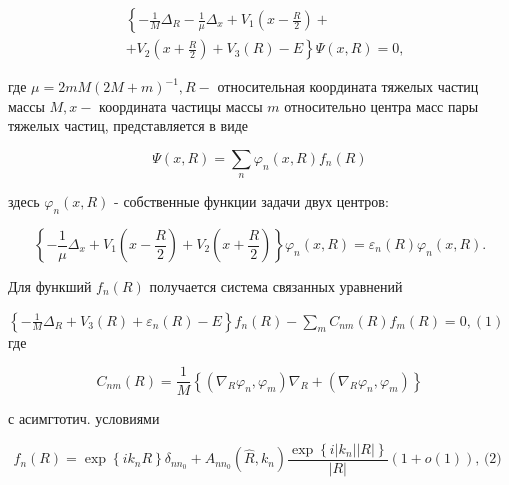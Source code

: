 \documentclass[10pt]{article}
\begin{document}
\[

\begin{aligned}

& \left\{-\frac{1}{M} \Delta_{R}-\frac{1}{\mu} \Delta_{x}+V_{1}\left(x-\frac{R}{2}\right)+\right. \\

& \left.+V_{2}\left(x+\frac{R}{2}\right)+V_{3}(R)-E\right\} \Psi(x, R)=0,

\end{aligned}

\]



где $\mu=2 m M(2 M+m)^{-1}, R-$ относительная координата тяжелых частиц массы $M, x-$ координата частицы массы $m$ относительно центра масс пары тяжелых частиц, представляется в виде



\[

\Psi(x, R)=\sum_{n} \varphi_{n}(x, R) f_{n}(R)

\]



здесь $\varphi_{n}(x, R)$ - собственные функции задачи двух центров:



\[

\left\{-\frac{1}{\mu} \Delta_{x}+V_{1}\left(x-\frac{R}{2}\right)+V_{2}\left(x+\frac{R}{2}\right)\right\} \varphi_{n}(x, R)=\varepsilon_{n}(R) \varphi_{n}(x, R) .

\]



Для функший $f_{n}(R)$ получается система связанных уравнений



$\left\{-\frac{1}{M} \Delta_{R}+V_{3}(R)+\varepsilon_{n}(R)-E\right\} f_{n}(R)-\sum_{m} C_{n m}(R) f_{m}(R)=0,(1)$ где



\[

C_{n m}(R)=\frac{1}{M}\left\{\left(\nabla_{R} \varphi_{n}, \varphi_{m}\right) \nabla_{R}+\left(\nabla_{R} \varphi_{n}, \varphi_{m}\right)\right\}

\]



с асимгтотич. условиями



\[

f_{n}(R)=\exp \left\{i k_{n} R\right\} \delta_{n n_{0}}+A_{n n_{0}}\left(\hat{R}, k_{n}\right) \frac{\exp \left\{i\left|k_{n}\right||R|\right\}}{|R|}(1+o(1)) \text {, (2) }

\]
\end{document}
